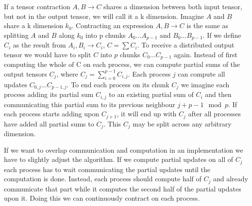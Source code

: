 If a tensor contraction $A,B \rightarrow C$ shares a dimension between both input tensor, but not in the output tensor, we will call it a k dimension.
Imagine $A$ and $B$ share a k dimension $k_0$.
Contracting an expression $A,B \rightarrow C$ is the same as splitting $A$ and $B$ along $k_0$ into p chunks $A_0\dots A_{p-1}$ and $B_0\dots B_{p-1}$.
If we define $C_i$ as the result from $A_i,B_i \rightarrow C_i$, $C=\sum{C_i}$.
To receive a distributed output tensor we would have to split $C$ into $p$ chunks $C_0\dots C_{p-1}$ again.
Instead of first computing the whole of C on each process, we can compute partial sums of the output tensors $C_j$, where 
$C_j = \sum_{i=0}^{p-1} C_{i,j}$.
Each process $j$ can compute all updates $C_{0,j}\dots C_{p-1,j}$.
To end each process on its chunk $C_j$ we imagine each process adding its partial sum $C_{i,j}$ to an existing partial sum of $C_i$ and then communicating this partial sum to its previous neighbour $j+p-1 \mod p$.
If each process starts adding upon $C_{j+1}$, it will end up with $C_j$ after all processes have added all partial sums to $C_j$.
This $C_j$ may be split across any arbitrary dimension.

If we want to overlap communication and computation in an implementation we have to slightly adjust the algorithm.
If we compute partial updates on all of $C_j$ each process has to wait communicating the partial updates until the computation is done.
Instead, each process should compute half of $C_j$ and already communicate that part while it computes the second half of the partial updates upon it.
Doing this we can continuously contract on each process.